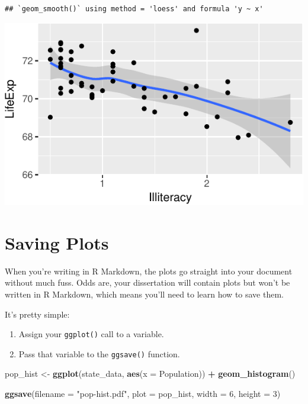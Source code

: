 \documentclass[
  12pt,
  oneside,openany]{book}
\newenvironment{Shaded}{\begin{snugshade}}{\end{snugshade}}
\newcommand{\DataTypeTok}[1]{\textcolor[rgb]{0.13,0.29,0.53}{#1}}
\newcommand{\DecValTok}[1]{\textcolor[rgb]{0.00,0.00,0.81}{#1}}
\newcommand{\KeywordTok}[1]{\textcolor[rgb]{0.13,0.29,0.53}{\textbf{#1}}}
\newcommand{\NormalTok}[1]{#1}
\newcommand{\OperatorTok}[1]{\textcolor[rgb]{0.81,0.36,0.00}{\textbf{#1}}}
\newcommand{\StringTok}[1]{\textcolor[rgb]{0.31,0.60,0.02}{#1}}
\providecommand{\tightlist}{%
  \setlength{\itemsep}{0pt}\setlength{\parskip}{0pt}}
\begin{document}
\begin{verbatim}
## `geom_smooth()` using method = 'loess' and formula 'y ~ x'
\end{verbatim}

\includegraphics{pdaps_files/figure-latex/combine-1.pdf}

\hypertarget{saving-plots}{%
\section{Saving Plots}\label{saving-plots}}

When you're writing in R Markdown, the plots go straight into your document without much fuss. Odds are, your dissertation will contain plots but won't be written in R Markdown, which means you'll need to learn how to save them.

It's pretty simple:

\begin{enumerate}
\def\labelenumi{\arabic{enumi}.}
\tightlist
\item
  Assign your \texttt{ggplot()} call to a variable.
\item
  Pass that variable to the \texttt{ggsave()} function.
\end{enumerate}

\begin{Shaded}
\begin{Highlighting}[]
\NormalTok{pop\_hist \textless{}{-}}\StringTok{ }\KeywordTok{ggplot}\NormalTok{(state\_data, }\KeywordTok{aes}\NormalTok{(}\DataTypeTok{x =}\NormalTok{ Population)) }\OperatorTok{+}
\StringTok{  }\KeywordTok{geom\_histogram}\NormalTok{()}

\KeywordTok{ggsave}\NormalTok{(}\DataTypeTok{filename =} \StringTok{"pop{-}hist.pdf"}\NormalTok{,}
       \DataTypeTok{plot =}\NormalTok{ pop\_hist,}
       \DataTypeTok{width =} \DecValTok{6}\NormalTok{,}
       \DataTypeTok{height =} \DecValTok{3}\NormalTok{)}
\end{Highlighting}
\end{Shaded}
\end{document}
